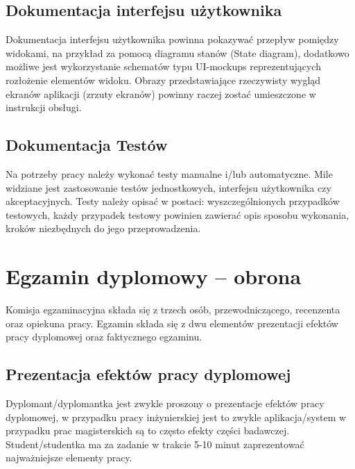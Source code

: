 \documentclass[12pt,a4paper]{article}
\begin{document}
\subsection{Dokumentacja interfejsu użytkownika}
Dokumentacja interfejsu użytkownika powinna pokazywać przepływ pomiędzy widokami, na przykład za pomocą diagramu stanów (State diagram), dodatkowo możliwe jest wykorzystanie schematów typu UI-mockups reprezentujących rozłożenie elementów widoku. Obrazy przedstawiające rzeczywisty wygląd ekranów aplikacji (zrzuty ekranów) powinny raczej zostać umieszczone w instrukcji obsługi.


\subsection{Dokumentacja Testów}

Na potrzeby pracy należy wykonać testy manualne i/lub automatyczne. Mile widziane jest zastosowanie testów jednostkowych, interfejsu użytkownika czy akceptacyjnych. Testy należy opisać w postaci: wyszczególnionych przypadków testowych, każdy przypadek testowy powinien zawierać opis sposobu wykonania, kroków niezbędnych do jego przeprowadzenia.


\section{Egzamin dyplomowy -- obrona}

Komisja egzaminacyjna składa się z trzech osób, przewodniczącego, recenzenta oraz opiekuna pracy. Egzamin składa się z dwu elementów prezentacji efektów pracy dyplomowej oraz faktycznego egzaminu.

\subsection{Prezentacja efektów pracy dyplomowej}
Dyplomant/dyplomantka jest zwykle proszony o prezentacje efektów pracy dyplomowej, w przypadku pracy inżynierskiej jest to zwykle aplikacja/system w przypadku prac magisterskich są to często efekty części badawczej. Student/studentka ma za zadanie w trakcie 5-10 minut zaprezentować najważniejsze elementy pracy.
\end{document}

